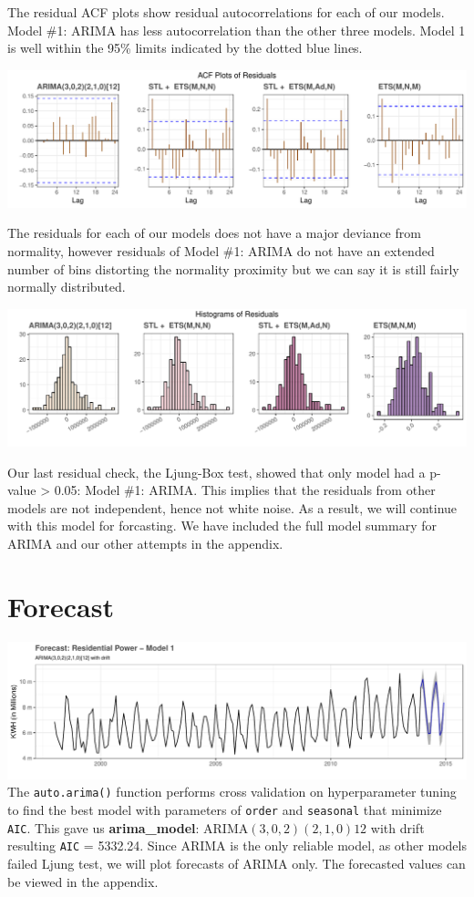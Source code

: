 \documentclass[openany]{book}
\begin{document}
The residual ACF plots show residual autocorrelations for each of our
models. Model \#1: ARIMA has less autocorrelation than the other three
models. Model 1 is well within the 95\% limits indicated by the dotted
blue lines.

\includegraphics{Group2_Project1_Fall2019_files/figure-latex/unnamed-chunk-11-1.pdf}

The residuals for each of our models does not have a major deviance from
normality, however residuals of Model \#1: ARIMA do not have an extended
number of bins distorting the normality proximity but we can say it is
still fairly normally distributed.

\includegraphics{Group2_Project1_Fall2019_files/figure-latex/unnamed-chunk-12-1.pdf}

Our last residual check, the Ljung-Box test, showed that only model had
a p-value \textgreater{} 0.05: Model \#1: ARIMA. This implies that the
residuals from other models are not independent, hence not white noise.
As a result, we will continue with this model for forcasting. We have
included the full model summary for ARIMA and our other attempts in the
appendix.

\hypertarget{forecast-1}{%
\section{Forecast}\label{forecast-1}}

\includegraphics{Group2_Project1_Fall2019_files/figure-latex/unnamed-chunk-13-1.pdf}
The \texttt{auto.arima()} function performs cross validation on
hyperparameter tuning to find the best model with parameters of
\texttt{order} and \texttt{seasonal} that minimize \texttt{AIC}. This
gave us \textbf{arima\_model}: ARIMA\((3,0,2)(2,1,0)12\) with drift
resulting \texttt{AIC} = 5332.24. Since ARIMA is the only reliable
model, as other models failed Ljung test, we will plot forecasts of
ARIMA only. The forecasted values can be viewed in the appendix.
\end{document}
